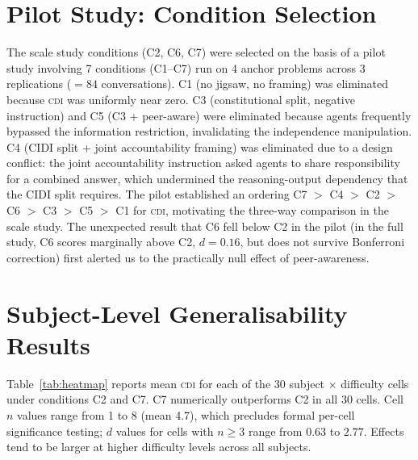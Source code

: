 \documentclass{article}
\newcommand{\CDI}{\textsc{cdi}}
\begin{document}
\section{Pilot Study: Condition Selection}
\label{app:pilot}

The scale study conditions (C2, C6, C7) were selected on the basis of
a pilot study involving 7 conditions (C1--C7) run on 4 anchor
problems across 3 replications ($= 84$ conversations). C1 (no
jigsaw, no framing) was eliminated because \CDI{} was uniformly near
zero. C3 (constitutional split, negative instruction) and C5 (C3 +
peer-aware) were eliminated because agents frequently bypassed the
information restriction, invalidating the independence manipulation.
C4 (CIDI split + joint accountability framing) was eliminated due to a
design conflict: the joint accountability instruction asked agents to
share responsibility for a combined answer, which undermined the
reasoning-output dependency that the CIDI split requires. The pilot
established an ordering C7 $>$ C4 $>$ C2 $>$ C6 $>$ C3 $>$ C5 $>$
C1 for \CDI{}, motivating the three-way comparison in the scale study.
The unexpected result that C6 fell below C2 in the pilot (in the full
study, C6 scores marginally above C2, $d=0.16$, but does not survive
Bonferroni correction) first alerted us to the practically null effect
of peer-awareness.

\section{Subject-Level Generalisability Results}
\label{app:heatmap}

Table~\ref{tab:heatmap} reports mean \CDI{} for each of the 30
subject $\times$ difficulty cells under conditions C2 and C7. C7
numerically outperforms C2 in all 30 cells. Cell $n$ values range from
1 to 8 (mean 4.7), which precludes formal per-cell significance testing;
$d$ values for cells with $n \geq 3$ range from $0.63$ to $2.77$.
Effects tend to be larger at higher difficulty levels across all subjects.
\end{document}
